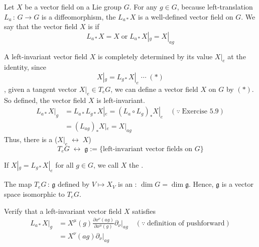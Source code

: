 \documentclass[a4paper, 10pt]{article}
\begin{document}
\seprule

\begin{definition}
    Let $X$ be a vector field on a Lie group $G$. For any $g \in G$, because left-translation $L_{a} \,:\, G \rightarrow G$ is a diffeomorphism, the  $L_{a\ast}X$ is a well-defined vector field on $G$. We say that the vector field $X$ is  if
    \[ \boxed{L_{a\ast}X = X} \; \text{or} \; \boxed{L_{a\ast}X|_{g} = X|_{ag}} \]
\end{definition}

\begin{obs}
    A left-invariant vector field $X$ is completely determined by its value $X|_{e}$ at the identity, since
    \[ \boxed{X|_{g} = L_{g\ast}X|_{e}} \; \cdots \; (\ast) \]
    , given a tangent vector $X|_{e} \in T_{e}G$, we can define a vector field $X$ on $G$ by $(\ast)$. So defined, the vector field $X$ is left-invariant.
    \begin{align*}
        L_{a\ast}X|_{g} &= L_{a\ast}L_{g\ast}X|_{e} = (L_{a} \circ L_{g})_{\ast} X|_{e} \quad (\because \; \text{Exercise 5.9}) \\
        &= (L_{ag})_{\ast}X|_{e} = X|_{ag}
    \end{align*}
    Thus, there is a  ($X|_{e} \;\leftrightarrow\; X$)
    \[ T_{e}G \; \leftrightarrow \; \mathfrak{g} := \{ \text{left-invariant vector fields on } G \} \]
\end{obs}

\begin{remark}
    If $X|_{g} = L_{g\ast}X|_{e}$ for all $g \in G$, we call $X$ the .
\end{remark}

\begin{remark}
    The map $T_{e}G \,:\, \mathfrak{g}$ defined by $V \mapsto X_{V}$ is an : $\dim G = \dim \mathfrak{g}$. Hence, $\mathfrak{g}$ is a vector space isomorphic to $T_{e}G$.
\end{remark}

\newpage


\begin{exer}
    Verify that a left-invariant vector field $X$ satisfies
    \begin{align*}
        L_{a\ast}X|_{g} &= X^{\mu}(g)\frac{\partial x^{\nu}(ag)}{\partial x^{\mu}(g)} \partial_{\nu}|_{ag} \quad (\because \; \text{definition of pushforward}) \\
        &= X^{\nu}(ag)\partial_{\nu}|_{ag}
    \end{align*}
\end{exer}
\end{document}
